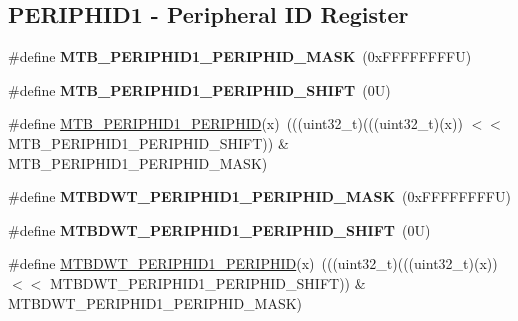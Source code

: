 \subsection*{P\+E\+R\+I\+P\+H\+I\+D1 -\/ Peripheral ID Register}
\begin{DoxyCompactItemize}
\item 
\mbox{\label{group___m_t_b___register___masks_gabff826ec0895cd5e2c61bd5ae3a8b1dc}} 
\#define {\bfseries M\+T\+B\+\_\+\+P\+E\+R\+I\+P\+H\+I\+D1\+\_\+\+P\+E\+R\+I\+P\+H\+I\+D\+\_\+\+M\+A\+SK}~(0x\+F\+F\+F\+F\+F\+F\+F\+F\+U)
\item 
\mbox{\label{group___m_t_b___register___masks_gaf28786db9600821e9b3bcc0024e243fc}} 
\#define {\bfseries M\+T\+B\+\_\+\+P\+E\+R\+I\+P\+H\+I\+D1\+\_\+\+P\+E\+R\+I\+P\+H\+I\+D\+\_\+\+S\+H\+I\+FT}~(0\+U)
\item 
\#define \mbox{\hyperlink{group___m_t_b___register___masks_gab259ccb6c24b01e53e4dee65501859cc}{M\+T\+B\+\_\+\+P\+E\+R\+I\+P\+H\+I\+D1\+\_\+\+P\+E\+R\+I\+P\+H\+ID}}(x)~(((uint32\+\_\+t)(((uint32\+\_\+t)(x)) $<$$<$ M\+T\+B\+\_\+\+P\+E\+R\+I\+P\+H\+I\+D1\+\_\+\+P\+E\+R\+I\+P\+H\+I\+D\+\_\+\+S\+H\+I\+FT)) \& M\+T\+B\+\_\+\+P\+E\+R\+I\+P\+H\+I\+D1\+\_\+\+P\+E\+R\+I\+P\+H\+I\+D\+\_\+\+M\+A\+SK)
\item 
\mbox{\label{group___m_t_b___register___masks_ga454b3b5f6fdf0afabb5ecf9bad14867a}} 
\#define {\bfseries M\+T\+B\+D\+W\+T\+\_\+\+P\+E\+R\+I\+P\+H\+I\+D1\+\_\+\+P\+E\+R\+I\+P\+H\+I\+D\+\_\+\+M\+A\+SK}~(0x\+F\+F\+F\+F\+F\+F\+F\+F\+U)
\item 
\mbox{\label{group___m_t_b___register___masks_ga5672cddf7ccbf00edee735d65ba9ed4b}} 
\#define {\bfseries M\+T\+B\+D\+W\+T\+\_\+\+P\+E\+R\+I\+P\+H\+I\+D1\+\_\+\+P\+E\+R\+I\+P\+H\+I\+D\+\_\+\+S\+H\+I\+FT}~(0\+U)
\item 
\#define \mbox{\hyperlink{group___m_t_b___register___masks_ga783ced663f97019caa15b6f270697d13}{M\+T\+B\+D\+W\+T\+\_\+\+P\+E\+R\+I\+P\+H\+I\+D1\+\_\+\+P\+E\+R\+I\+P\+H\+ID}}(x)~(((uint32\+\_\+t)(((uint32\+\_\+t)(x)) $<$$<$ M\+T\+B\+D\+W\+T\+\_\+\+P\+E\+R\+I\+P\+H\+I\+D1\+\_\+\+P\+E\+R\+I\+P\+H\+I\+D\+\_\+\+S\+H\+I\+FT)) \& M\+T\+B\+D\+W\+T\+\_\+\+P\+E\+R\+I\+P\+H\+I\+D1\+\_\+\+P\+E\+R\+I\+P\+H\+I\+D\+\_\+\+M\+A\+SK)
\item 

\end{DoxyCompactItemize}
